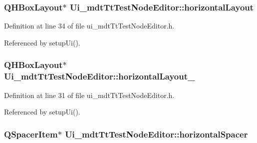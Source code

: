 \hypertarget{class_ui__mdt_tt_test_node_editor_a911a7fedd30e2f09360b692efbb35dee}{
\subsubsection[{horizontal\-Layout}]{\setlength{\rightskip}{0pt plus 5cm}Q\-H\-Box\-Layout$\ast$ Ui\-\_\-mdt\-Tt\-Test\-Node\-Editor\-::horizontal\-Layout}}\label{class_ui__mdt_tt_test_node_editor_a911a7fedd30e2f09360b692efbb35dee}


Definition at line 34 of file ui\-\_\-mdt\-Tt\-Test\-Node\-Editor.\-h.



Referenced by setup\-Ui().

\hypertarget{class_ui__mdt_tt_test_node_editor_a386195831ebfa1edfcb0e218865fa202}{
\subsubsection[{horizontal\-Layout\-\_\-2}]{\setlength{\rightskip}{0pt plus 5cm}Q\-H\-Box\-Layout$\ast$ Ui\-\_\-mdt\-Tt\-Test\-Node\-Editor\-::horizontal\-Layout\-\_}}\label{class_ui__mdt_tt_test_node_editor_a386195831ebfa1edfcb0e218865fa202}


Definition at line 31 of file ui\-\_\-mdt\-Tt\-Test\-Node\-Editor.\-h.



Referenced by setup\-Ui().

\hypertarget{class_ui__mdt_tt_test_node_editor_a42894314ac995c0e53fddc84c95dca9e}{
\subsubsection[{horizontal\-Spacer}]{\setlength{\rightskip}{0pt plus 5cm}Q\-Spacer\-Item$\ast$ Ui\-\_\-mdt\-Tt\-Test\-Node\-Editor\-::horizontal\-Spacer}}\label{class_ui__mdt_tt_test_node_editor_a42894314ac995c0e53fddc84c95dca9e}


